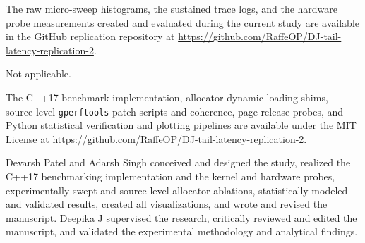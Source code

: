 \documentclass[pdflatex,sn-mathphys-num]{sn-jnl}
\begin{document}
The raw micro-sweep histograms, the sustained trace logs, and the hardware probe measurements created and evaluated during the current study are available in the GitHub replication repository at \url{https://github.com/RaffeOP/DJ-tail-latency-replication-2}.


Not applicable.


The C++17 benchmark implementation, allocator dynamic-loading shims, source-level \texttt{gperftools} patch scripts and coherence, page-release probes, and Python statistical verification and plotting pipelines are available under the MIT License at \url{https://github.com/RaffeOP/DJ-tail-latency-replication-2}.


Devarsh Patel and Adarsh Singh conceived and designed the study, realized the C++17 benchmarking implementation and the kernel and hardware probes, experimentally swept and source-level allocator ablations, statistically modeled and validated results, created all visualizations, and wrote and revised the manuscript. Deepika J supervised the research, critically reviewed and edited the manuscript, and validated the experimental methodology and analytical findings.

\clearpage
\end{document}
